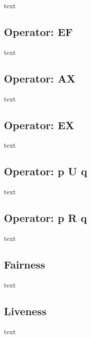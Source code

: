 \documentclass{article}
\begin{document}
		text
		
		\subsection{Operator: EF}
				
		text
		
		\subsection{Operator: AX}
				
		text
		
		\subsection{Operator: EX}
				
		text
		
		\subsection{Operator: p U q}
				
		text
		
		\subsection{Operator: p R q}
				
		text
		
		\subsection{Fairness}
				
		text
		
		\subsection{Liveness}
			
		text
		
	
	\newpage
	
	
	
	
	
\end{document}
